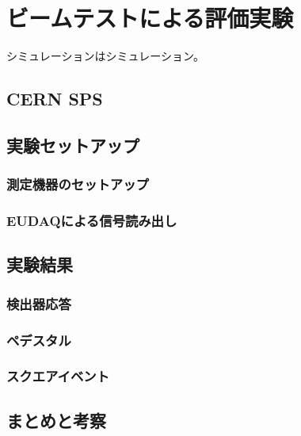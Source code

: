 
\chapter{ビームテストによる評価実験} \label{sec:Beamtest}
シミュレーションはシミュレーション。
\section{CERN SPS}
\section{実験セットアップ}
\subsection{測定機器のセットアップ}
\subsection{EUDAQによる信号読み出し}
\section{実験結果}
\subsection{検出器応答}
\subsection{ペデスタル}
\subsection{スクエアイベント}
\section{まとめと考察}